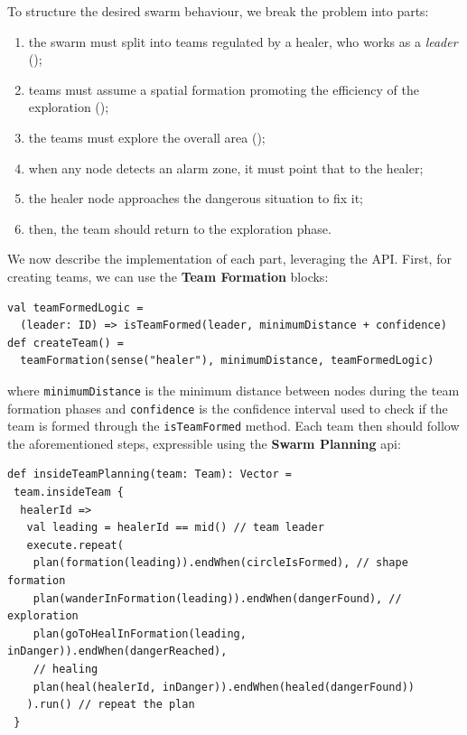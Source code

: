 To structure the desired swarm behaviour, 
 we break the problem into parts:
\begin{enumerate}
  \item the swarm must split into teams regulated by a healer, who works as a \emph{leader} %
   ();
  \item teams must assume a spatial formation promoting the efficiency of the exploration ();
  \item the teams must explore the overall area ();
  \item when any node detects an alarm zone, it must point that to the healer;
  \item the healer node approaches the dangerous situation to fix it;
  \item then, the team should return to the exploration phase.
\end{enumerate}
%
We now describe the implementation of each part, leveraging the \MacroSwarm{} API. %
First, for creating teams, we can use the \textbf{Team Formation} blocks:
\begin{lstlisting}
val teamFormedLogic = 
  (leader: ID) => isTeamFormed(leader, minimumDistance + confidence)
def createTeam() = 
  teamFormation(sense("healer"), minimumDistance, teamFormedLogic)
\end{lstlisting}
where \lstinline|minimumDistance| is the minimum distance between nodes during the 
 team formation phases and \lstinline|confidence| is the confidence interval 
 used to check if the team is formed through the \lstinline|isTeamFormed| method.
%
Each team then should follow the aforementioned steps, 
 expressible using the \textbf{Swarm Planning} \ac{api}: 
%
\begin{lstlisting}[xrightmargin=-2pt]
def insideTeamPlanning(team: Team): Vector = 
 team.insideTeam {
  healerId =>
   val leading = healerId == mid() // team leader
   execute.repeat(
    plan(formation(leading)).endWhen(circleIsFormed), // shape formation
    plan(wanderInFormation(leading)).endWhen(dangerFound), // exploration
    plan(goToHealInFormation(leading, inDanger)).endWhen(dangerReached), 
    // healing
    plan(heal(healerId, inDanger)).endWhen(healed(dangerFound)) 
   ).run() // repeat the plan
 }
\end{lstlisting}
